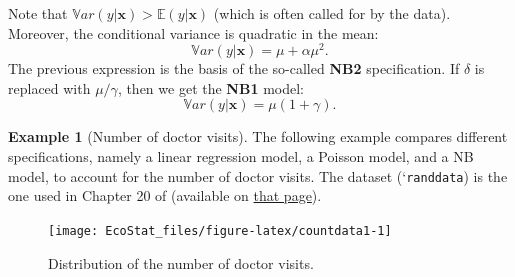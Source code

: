 \documentclass[
  12pt,
]{book}
\newenvironment{Shaded}{\begin{snugshade}}{\end{snugshade}}
\newcommand{\AttributeTok}[1]{\textcolor[rgb]{0.77,0.63,0.00}{#1}}
\newcommand{\CommentTok}[1]{\textcolor[rgb]{0.56,0.35,0.01}{\textit{#1}}}
\newcommand{\DecValTok}[1]{\textcolor[rgb]{0.00,0.00,0.81}{#1}}
\newcommand{\FunctionTok}[1]{\textcolor[rgb]{0.00,0.00,0.00}{#1}}
\newcommand{\NormalTok}[1]{#1}
\newcommand{\SpecialCharTok}[1]{\textcolor[rgb]{0.00,0.00,0.00}{#1}}
\theoremstyle{definition}
\theoremstyle{definition}
\newtheorem{example}{Example}[chapter]
\theoremstyle{definition}
\theoremstyle{definition}
\theoremstyle{remark}
\begin{document}
Note that \(\mathbb{V}ar(y|\mathbf{x}) > \mathbb{E}(y|\mathbf{x})\) (which is often called for by the data). Moreover, the conditional variance is quadratic in the mean:
\[
\mathbb{V}ar(y|\mathbf{x}) = \mu+\alpha \mu^2.
\]
The previous expression is the basis of the so-called \textbf{NB2} specification. If \(\delta\) is replaced with \(\mu/\gamma\), then we get the \textbf{NB1} model:
\[
\mathbb{V}ar(y|\mathbf{x}) = \mu(1+\gamma).
\]

\begin{example}[Number of doctor visits]
\protect\hypertarget{exm:Doctorvisits}{}\label{exm:Doctorvisits}The following example compares different specifications, namely a linear regression model, a Poisson model, and a NB model, to account for the number of doctor visits. The dataset (`\texttt{randdata}) is the one used in Chapter 20 of \citet{Cameron_Trivedi_2005} (available on \href{http://cameron.econ.ucdavis.edu/mmabook/mmadata.html}{that page}).

\begin{Shaded}
\end{Shaded}

\begin{figure}
\texttt{[image: EcoStat\_files/figure-latex/countdata1-1]} \caption{Distribution of the number of doctor visits.}\label{fig:countdata1}
\end{figure}


\end{example}
\end{document}
